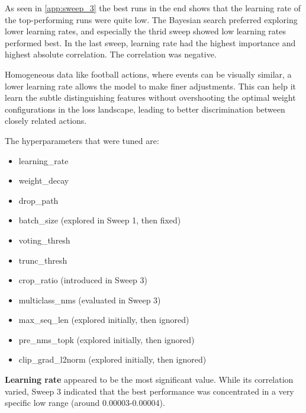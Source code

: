 
As seen in \autoref{app:sweep_3} the best runs in the end shows that the learning rate of the top-performing runs were quite low. The Bayesian search preferred exploring lower learning rates, and especially the thrid sweep showed low learning rates performed best. In the last sweep, learning rate had the highest importance and highest absolute correlation. The correlation was negative. 

Homogeneous data like football actions, where events can be visually similar, a lower learning rate allows the model to make finer adjustments. This can help it learn the subtle distinguishing features without overshooting the optimal weight configurations in the loss landscape, leading to better discrimination between closely related actions.


The hyperparameters that were tuned are:
\begin{itemize}
    \item learning\_rate
    \item weight\_decay
    \item drop\_path 
    \item batch\_size (explored in Sweep 1, then fixed)
    \item voting\_thresh
    \item trunc\_thresh
    \item crop\_ratio (introduced in Sweep 3)
    \item multiclass\_nms (evaluated in Sweep 3)
    \item max\_seq\_len (explored initially, then ignored)
    \item pre\_nms\_topk (explored initially, then ignored)
    \item clip\_grad\_l2norm (explored initially, then ignored)
\end{itemize}

\textbf{Learning rate} appeared to be the most significant value. While its correlation varied, Sweep 3 indicated that the best performance was concentrated in a very specific low range (around 0.00003-0.00004). 

